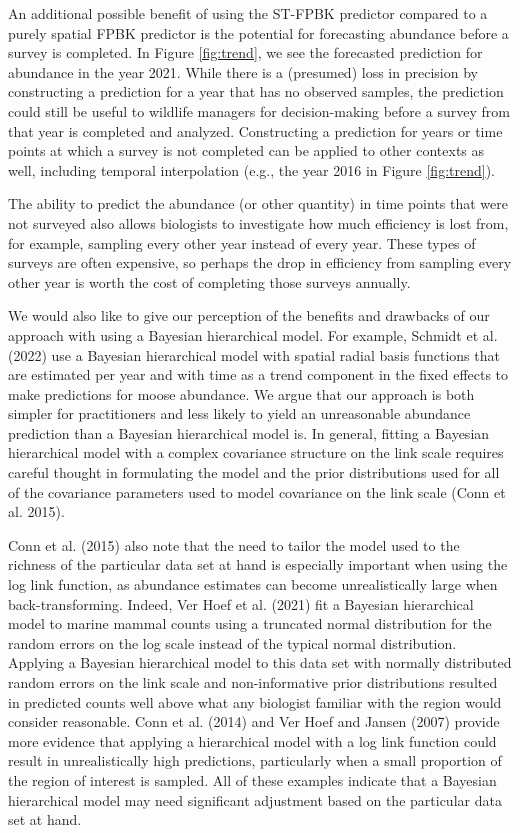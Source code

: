 \documentclass[smallextended]{svjour3}       %
\begin{document}
An additional possible benefit of using the ST-FPBK predictor compared
to a purely spatial FPBK predictor is the potential for forecasting
abundance before a survey is completed. In Figure \ref{fig:trend}, we
see the forecasted prediction for abundance in the year 2021. While
there is a (presumed) loss in precision by constructing a prediction for
a year that has no observed samples, the prediction could still be
useful to wildlife managers for decision-making before a survey from
that year is completed and analyzed. Constructing a prediction for years
or time points at which a survey is not completed can be applied to
other contexts as well, including temporal interpolation (e.g., the year
2016 in Figure \ref{fig:trend}).

The ability to predict the abundance (or other quantity) in time points
that were not surveyed also allows biologists to investigate how much
efficiency is lost from, for example, sampling every other year instead
of every year. These types of surveys are often expensive, so perhaps
the drop in efficiency from sampling every other year is worth the cost
of completing those surveys annually.

We would also like to give our perception of the benefits and drawbacks
of our approach with using a Bayesian hierarchical model. For example,
Schmidt et al. (2022) use a Bayesian hierarchical model with spatial
radial basis functions that are estimated per year and with time as a
trend component in the fixed effects to make predictions for moose
abundance. We argue that our approach is both simpler for practitioners
and less likely to yield an unreasonable abundance prediction than a
Bayesian hierarchical model is. In general, fitting a Bayesian
hierarchical model with a complex covariance structure on the link scale
requires careful thought in formulating the model and the prior
distributions used for all of the covariance parameters used to model
covariance on the link scale (Conn et al. 2015).

Conn et al. (2015) also note that the need to tailor the model used to
the richness of the particular data set at hand is especially important
when using the log link function, as abundance estimates can become
unrealistically large when back-transforming. Indeed, Ver Hoef et al.
(2021) fit a Bayesian hierarchical model to marine mammal counts using a
truncated normal distribution for the random errors on the log scale
instead of the typical normal distribution. Applying a Bayesian
hierarchical model to this data set with normally distributed random
errors on the link scale and non-informative prior distributions
resulted in predicted counts well above what any biologist familiar with
the region would consider reasonable. Conn et al. (2014) and Ver Hoef
and Jansen (2007) provide more evidence that applying a hierarchical
model with a log link function could result in unrealistically high
predictions, particularly when a small proportion of the region of
interest is sampled. All of these examples indicate that a Bayesian
hierarchical model may need significant adjustment based on the
particular data set at hand.
\end{document}
